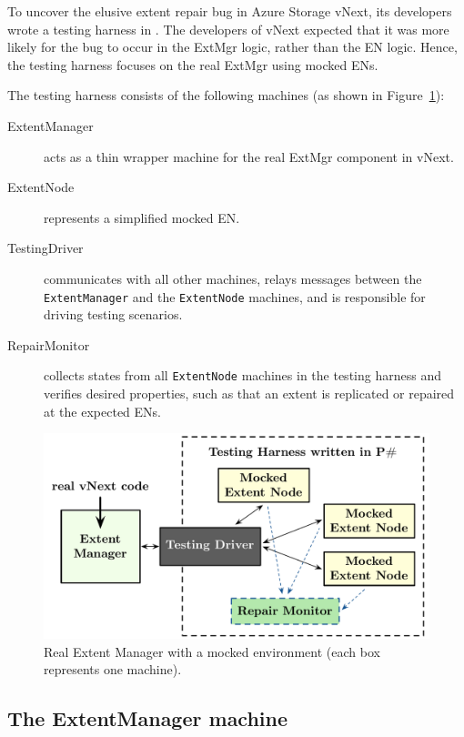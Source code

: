 To uncover the elusive extent repair bug in Azure Storage vNext, its developers wrote a testing harness in \psharp. The developers of vNext expected that it was more likely for the bug to occur in the ExtMgr logic, rather than the EN logic. Hence, the testing harness focuses on the real ExtMgr using mocked ENs.

The testing harness consists of the following \psharp machines (as shown in Figure~\ref{fig:azurestoremodel}):
\begin{description}
\item[ExtentManager] acts as a thin wrapper machine for the real ExtMgr component in vNext.

\item[ExtentNode] represents a simplified mocked EN.

\item[TestingDriver] communicates with all other machines, relays messages between the \texttt{ExtentManager} and the \texttt{ExtentNode} machines, and is responsible for driving testing scenarios.

\item[RepairMonitor] collects states from all \texttt{ExtentNode} machines in the testing harness and verifies desired properties, such as that an extent is replicated or repaired at the expected ENs.
\end{description}

\begin{figure}[t]
\centering
\includegraphics[width=\linewidth]{img/mocked_vnext}
\caption{Real Extent Manager with a mocked environment (each box represents one \psharp machine).}
\label{fig:azurestoremodel}
\end{figure}

\subsection{The ExtentManager machine}
\label{sec:method:wrap_target}

